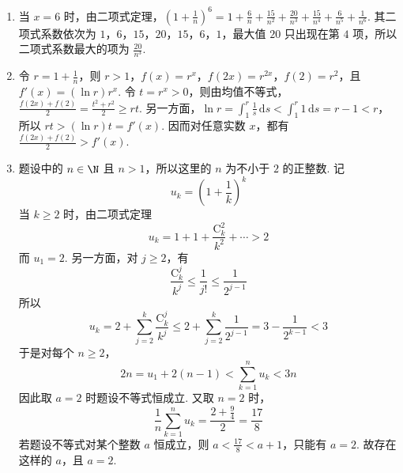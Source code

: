 \begin{solution}
\begin{enumerate}
\item 当 \(x=6\) 时，由二项式定理，\(\left(1+\frac{1}{n}\right)^6=1+\frac{6}{n}+\frac{15}{n^2}+\frac{20}{n^3}+\frac{15}{n^4}+\frac{6}{n^5}+\frac{1}{n^6}\). 其二项式系数依次为 \(1\)，\(6\)，\(15\)，\(20\)，\(15\)，\(6\)，\(1\)，最大值 \(20\) 只出现在第 \(4\) 项，所以二项式系数最大的项为 \(\frac{20}{n^3}\).
\item 令 \(r=1+\frac{1}{n}\)，则 \(r>1\)，\(f(x)=r^x\)，\(f(2x)=r^{2x}\)，\(f(2)=r^2\)，且 \(f'(x)=(\ln r)r^x\). 令 \(t=r^x>0\)，则由均值不等式，\(\frac{f(2x)+f(2)}{2}=\frac{t^2+r^2}{2}\geqslant rt\). 另一方面，\(\ln r=\int_{1}^{r}\frac{1}{s}\,\mathrm ds<\int_{1}^{r}1\,\mathrm ds=r-1<r\)，所以 \(rt>(\ln r)t=f'(x)\). 因而对任意实数 \(x\)，都有 \(\frac{f(2x)+f(2)}{2}>f'(x)\).
\item 题设中的 \(n\in\N\) 且 \(n>1\)，所以这里的 \(n\) 为不小于 \(2\) 的正整数. 记
\[
u_k=\left(1+\frac1k\right)^k
\]
当 \(k\geq2\) 时，由二项式定理
\[
u_k=1+1+\frac{\mathrm C_k^2}{k^2}+\cdots>2
\]
而 \(u_1=2\). 另一方面，对 \(j\geq2\)，有
\[
\frac{\mathrm C_k^j}{k^j}\leq\frac1{j!}\leq\frac1{2^{j-1}}
\]
所以
\[
u_k=2+\sum_{j=2}^{k}\frac{\mathrm C_k^j}{k^j}
\leq2+\sum_{j=2}^{k}\frac1{2^{j-1}}
=3-\frac1{2^{k-1}}<3
\]
于是对每个 \(n\geq2\)，
\[
2n=u_1+2(n-1)<\sum_{k=1}^{n}u_k<3n
\]
因此取 \(a=2\) 时题设不等式恒成立. 又取 \(n=2\) 时，
\[
\frac1n\sum_{k=1}^{n}u_k=\frac{2+\frac94}{2}=\frac{17}{8}
\]
若题设不等式对某个整数 \(a\) 恒成立，则 \(a<\frac{17}{8}<a+1\)，只能有 \(a=2\). 故存在这样的 \(a\)，且 \(a=2\).
\end{enumerate}
\end{solution}
